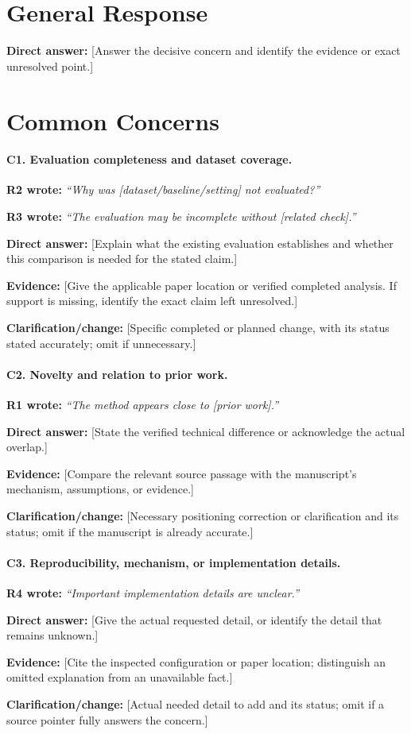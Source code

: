 \documentclass[10pt]{article}
\newcommand{\quotedconcern}[3]{\par\noindent\textcolor{#1}{\textbf{#2 wrote:}} \emph{``#3''}\par}
\newcommand{\directanswer}[1]{\par\noindent\textbf{Direct answer:} #1\par}
\newcommand{\evidence}[1]{\par\noindent\textbf{Evidence:} #1\par}
\newcommand{\change}[1]{\par\noindent\textbf{Clarification/change:} #1\par}
\begin{document}
\section*{General Response}

\directanswer{[Answer the decisive concern and identify the evidence or exact unresolved point.]}


\section*{Common Concerns}

\paragraph{C1. Evaluation completeness and dataset coverage.}
\quotedconcern{revtwo}{R2}{Why was [dataset/baseline/setting] not evaluated?}
\quotedconcern{revthree}{R3}{The evaluation may be incomplete without [related check].}
\directanswer{[Explain what the existing evaluation establishes and whether this comparison is needed for the stated claim.]}
\evidence{[Give the applicable paper location or verified completed analysis. If support is missing, identify the exact claim left unresolved.]}
\change{[Specific completed or planned change, with its status stated accurately; omit if unnecessary.]}

\paragraph{C2. Novelty and relation to prior work.}
\quotedconcern{revone}{R1}{The method appears close to [prior work].}
\directanswer{[State the verified technical difference or acknowledge the actual overlap.]}
\evidence{[Compare the relevant source passage with the manuscript's mechanism, assumptions, or evidence.]}
\change{[Necessary positioning correction or clarification and its status; omit if the manuscript is already accurate.]}

\paragraph{C3. Reproducibility, mechanism, or implementation details.}
\quotedconcern{revfour}{R4}{Important implementation details are unclear.}
\directanswer{[Give the actual requested detail, or identify the detail that remains unknown.]}
\evidence{[Cite the inspected configuration or paper location; distinguish an omitted explanation from an unavailable fact.]}
\change{[Actual needed detail to add and its status; omit if a source pointer fully answers the concern.]}
\end{document}
